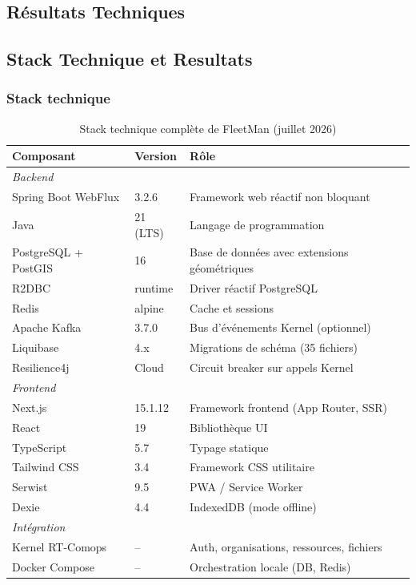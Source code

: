 \documentclass[12pt,a4paper]{report}
\begin{document}
\begin{enumerate}[leftmargin=2cm]
\part{Résultats Techniques}

\chapter{Stack Technique et Resultats}

\section{Stack technique}

\begin{table}[H]
\caption{Stack technique complète de FleetMan (juillet 2026)}
\label{tab:stack}
\centering\small
\begin{tabularx}{\textwidth}{p{4.5cm}p{2.5cm}X}
\toprule
\textbf{Composant} & \textbf{Version} & \textbf{Rôle} \\
\midrule
\multicolumn{3}{l}{\textit{Backend}} \\
\midrule
Spring Boot WebFlux & 3.2.6    & Framework web réactif non bloquant \\
Java               & 21 (LTS) & Langage de programmation \\
PostgreSQL + PostGIS & 16     & Base de données avec extensions géométriques \\
R2DBC              & runtime  & Driver réactif PostgreSQL \\
Redis              & alpine   & Cache et sessions \\
Apache Kafka       & 3.7.0    & Bus d'événements Kernel (optionnel) \\
Liquibase          & 4.x      & Migrations de schéma (35 fichiers) \\
Resilience4j       & Cloud    & Circuit breaker sur appels Kernel \\
\midrule
\multicolumn{3}{l}{\textit{Frontend}} \\
\midrule
Next.js            & 15.1.12  & Framework frontend (App Router, SSR) \\
React              & 19       & Bibliothèque UI \\
TypeScript         & 5.7      & Typage statique \\
Tailwind CSS       & 3.4      & Framework CSS utilitaire \\
Serwist            & 9.5      & PWA / Service Worker \\
Dexie              & 4.4      & IndexedDB (mode offline) \\
\midrule
\multicolumn{3}{l}{\textit{Intégration}} \\
\midrule
Kernel RT-Comops   & --       & Auth, organisations, ressources, fichiers \\
Docker Compose     & --       & Orchestration locale (DB, Redis) \\
\bottomrule
\end{tabularx}
\end{table}


\end{enumerate}
\end{document}
